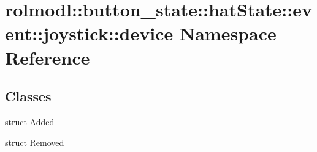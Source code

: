 \hypertarget{namespacerolmodl_1_1button__state_1_1hat_state_1_1event_1_1joystick_1_1device}{}\section{rolmodl\+::button\+\_\+state\+::hat\+State\+::event\+::joystick\+::device Namespace Reference}
\label{namespacerolmodl_1_1button__state_1_1hat_state_1_1event_1_1joystick_1_1device}
\subsection*{Classes}
\begin{DoxyCompactItemize}
\item 
struct \mbox{\hyperlink{structrolmodl_1_1button__state_1_1hat_state_1_1event_1_1joystick_1_1device_1_1_added}{Added}}
\item 
struct \mbox{\hyperlink{structrolmodl_1_1button__state_1_1hat_state_1_1event_1_1joystick_1_1device_1_1_removed}{Removed}}
\end{DoxyCompactItemize}
